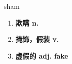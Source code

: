 
\begin{frame}
{\huge sham}
\begin{center}
\begin{enumerate}\Large
  \item \textbf{欺瞒 n.}
  \item \textbf{掩饰，假装 v.}
  \item \textbf{虚假的 adj. fake}
\end{enumerate}
\end{center}
\end{frame}
